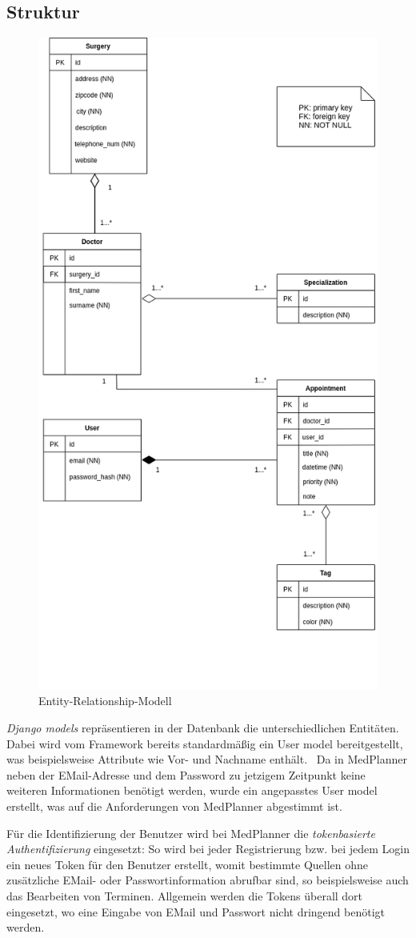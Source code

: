\documentclass[conference]{IEEEtran}
\begin{document}
\subsection{Struktur}\label{structure}
\begin{figure}[!h]
	\centering
	\includegraphics[width=0.68\columnwidth]{./figures/concepts}
	\caption{Entity-Relationship-Modell}
\end{figure}
\textit{Django models} repräsentieren in der Datenbank die unterschiedlichen Entitäten. Dabei wird vom Framework bereits standardmäßig ein User model bereitgestellt, was beispielsweise Attribute wie Vor- und Nachname enthält.~\cite{django-default-user} Da in MedPlanner neben der EMail-Adresse und dem Password zu jetzigem Zeitpunkt keine weiteren Informationen benötigt werden, wurde ein angepasstes User model erstellt, was auf die Anforderungen von MedPlanner abgestimmt ist.

Für die Identifizierung der Benutzer wird bei MedPlanner die \textit{tokenbasierte Authentifizierung} eingesetzt: So wird bei jeder Registrierung bzw. bei jedem Login ein neues Token für den Benutzer erstellt, womit bestimmte Quellen ohne zusätzliche EMail- oder Passwortinformation abrufbar sind, so beispielsweise auch das Bearbeiten von Terminen. Allgemein werden die Tokens überall dort eingesetzt, wo eine Eingabe von EMail und Passwort nicht dringend benötigt werden.
\end{document}
